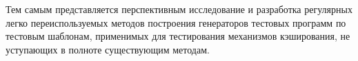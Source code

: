 Тем самым представляется перспективным исследование и разработка
регулярных легко переиспользуемых методов построения генераторов
тестовых программ по тестовым шаблонам, применимых для тестирования
механизмов кэширования, не уступающих в полноте существующим
методам.

%
%
%
